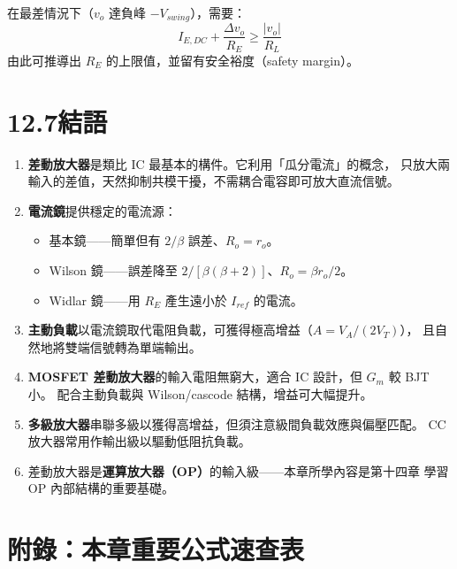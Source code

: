 \documentclass[12pt]{article}
\begin{document}
\noindent 在最差情況下（$v_o$ 達負峰 $-V_{swing}$），需要：
\[
  I_{E,DC} + \frac{\Delta v_o}{R_E} \ge \frac{|v_o|}{R_L}
\]
由此可推導出 $R_E$ 的上限值，並留有安全裕度（safety margin）。

\section*{12.7\quad 結語}

\begin{keybox}[本章核心觀念總覽]
\begin{enumerate}[leftmargin=2em,itemsep=3pt]
  \item \textbf{差動放大器}是類比 IC 最基本的構件。它利用「瓜分電流」的概念，
        只放大兩輸入的差值，天然抑制共模干擾，不需耦合電容即可放大直流信號。
  \item \textbf{電流鏡}提供穩定的電流源：
        \begin{itemize}[leftmargin=1.5em,itemsep=1pt]
          \item 基本鏡——簡單但有 $2/\beta$ 誤差、$R_o = r_o$。
          \item Wilson 鏡——誤差降至 $2/[\beta(\beta+2)]$、$R_o = \beta r_o/2$。
          \item Widlar 鏡——用 $R_E$ 產生遠小於 $I_{ref}$ 的電流。
        \end{itemize}
  \item \textbf{主動負載}以電流鏡取代電阻負載，可獲得極高增益（$A = V_A/(2V_T)$），
        且自然地將雙端信號轉為單端輸出。
  \item \textbf{MOSFET 差動放大器}的輸入電阻無窮大，適合 IC 設計，但 $G_m$ 較 BJT 小。
        配合主動負載與 Wilson/cascode 結構，增益可大幅提升。
  \item \textbf{多級放大器}串聯多級以獲得高增益，但須注意級間負載效應與偏壓匹配。
        CC 放大器常用作輸出級以驅動低阻抗負載。
  \item 差動放大器是\textbf{運算放大器（OP）}的輸入級——本章所學內容是第十四章
        學習 OP 內部結構的重要基礎。
\end{enumerate}
\end{keybox}

\section*{附錄：本章重要公式速查表}
\end{document}
